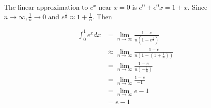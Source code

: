 \documentclass[9pt]{article}
\begin{document}
The linear approximation to $e^x$ near $x = 0$ is $e^0 + e^0 x = 1 + x$. Since $n \rightarrow \infty, \frac{1}{n} \rightarrow 0$ and $e^{\frac{1}{n}} \approx 1 + \frac{1}{n}$. Then

\begin{align*}
  \int_{0}^{1} e^x dx &= \lim\limits_{n \to \infty} \frac{1 - e}{n(1 - e^{\frac{1}{n}})}\\
                      &\approx \lim\limits_{n \to \infty} \frac{1 - e}{n(1 - (1 + \frac{1}{n}))}\\
                      &= \lim\limits_{n \to \infty} \frac{1 - e}{n(-\frac{1}{n})}\\
                      &= \lim\limits_{n \to \infty} \frac{1 - e}{-1}\\
                      &= \lim\limits_{n \to \infty} e - 1\\
                      &= e - 1
\end{align*}
\end{document}
